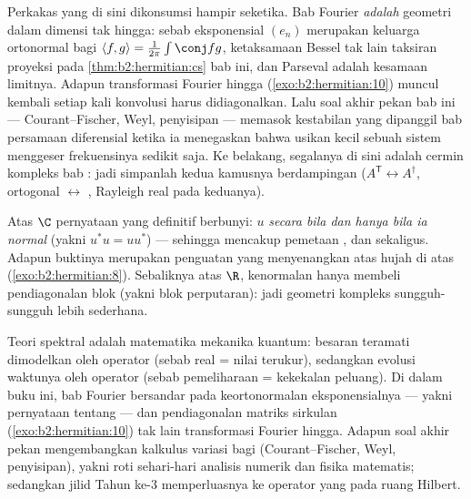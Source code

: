 \begin{remark}
Perkakas  yang  di sini dikonsumsi hampir
seketika. Bab Fourier \emph{adalah} geometri 
dalam dimensi tak hingga: sebab eksponensial $(e_n)$ merupakan
keluarga ortonormal bagi $\langle f, g\rangle =
\frac{1}{2\pi}\int\conj fg$, ketaksamaan Bessel tak lain taksiran
proyeksi pada \cref{thm:b2:hermitian:cs} bab ini,
dan Parseval adalah kesamaan limitnya. Adapun transformasi Fourier hingga
(\cref{exo:b2:hermitian:10}) muncul kembali setiap kali konvolusi
harus didiagonalkan. Lalu soal akhir pekan bab ini ---
Courant--Fischer, Weyl, penyisipan --- memasok
kestabilan  yang dipanggil bab persamaan diferensial
ketika ia menegaskan bahwa usikan kecil sebuah sistem
menggeser frekuensinya sedikit saja. Ke belakang, segalanya di sini
adalah cermin kompleks bab : jadi simpanlah
kedua kamusnya berdampingan ($A^{\mathsf T} \leftrightarrow
A^\dagger$, ortogonal $\leftrightarrow$ , Rayleigh
real pada keduanya).
\end{remark}

\begin{remark}
Atas $\C$ pernyataan yang definitif berbunyi: $u$ \emph{ secara  bila dan hanya bila ia normal} (yakni $u^*u = uu^*$)
--- sehingga mencakup pemetaan ,  dan  sekaligus. Adapun
buktinya merupakan penguatan yang menyenangkan atas hujah di atas
(\cref{exo:b2:hermitian:8}). Sebaliknya atas $\R$, kenormalan hanya
membeli pendiagonalan blok (yakni blok perputaran): jadi geometri kompleks
sungguh-sungguh lebih sederhana.
\end{remark}

\begin{remark}
Teori spektral  adalah matematika mekanika
kuantum: besaran teramati dimodelkan oleh operator 
(sebab  real = nilai terukur), sedangkan evolusi waktunya oleh
operator  (sebab pemeliharaan  = kekekalan peluang). Di dalam
buku ini, bab Fourier bersandar pada keortonormalan
eksponensialnya --- yakni pernyataan tentang  --- dan
pendiagonalan matriks sirkulan
(\cref{exo:b2:hermitian:10}) tak lain transformasi Fourier hingga.
Adapun soal akhir pekan mengembangkan kalkulus variasi bagi
 (Courant--Fischer, Weyl, penyisipan), yakni roti
sehari-hari analisis numerik dan fisika matematis; sedangkan jilid Tahun
ke-3 memperluasnya ke operator  yang  pada
ruang Hilbert.
\end{remark}

